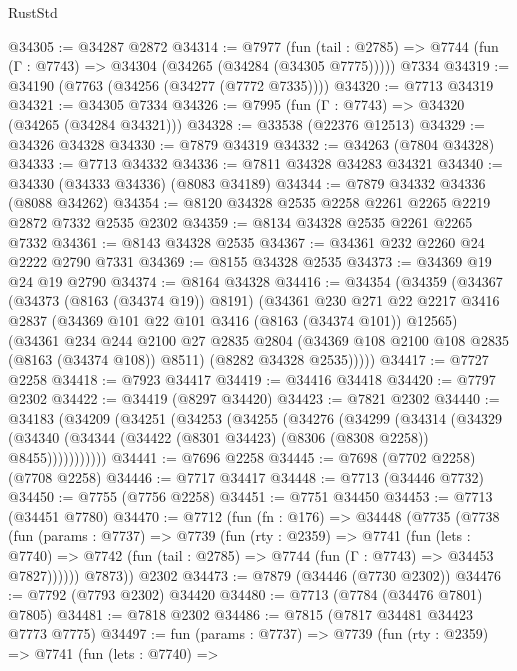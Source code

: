 \begin{lexlean}{RustStd}
\begin{coremodule}
@34305 := @34287 @2872
@34314 := @7977
    (fun (tail : @2785) => @7744 (fun (Γ : @7743) => @34304 (@34265 (@34284 (@34305 @7775)))))
    @7334
@34319 := @34190 (@7763 (@34256 (@34277 (@7772 @7335))))
@34320 := @7713 @34319
@34321 := @34305 @7334
@34326 := @7995 (fun (Γ : @7743) => @34320 (@34265 (@34284 @34321)))
@34328 := @33538 (@22376 @12513)
@34329 := @34326 @34328
@34330 := @7879 @34319
@34332 := @34263 (@7804 @34328)
@34333 := @7713 @34332
@34336 := @7811 @34328 @34283 @34321
@34340 := @34330 (@34333 @34336) (@8083 @34189)
@34344 := @7879 @34332 @34336 (@8088 @34262)
@34354 := @8120 @34328 @2535 @2258 @2261 @2265 @2219 @2872 @7332 @2535 @2302
@34359 := @8134 @34328 @2535 @2261 @2265 @7332
@34361 := @8143 @34328 @2535
@34367 := @34361 @232 @2260 @24 @2222 @2790 @7331
@34369 := @8155 @34328 @2535
@34373 := @34369 @19 @24 @19 @2790
@34374 := @8164 @34328
@34416 := @34354
    (@34359
      (@34367
        (@34373 (@8163 (@34374 @19)) @8191)
        (@34361
          @230
          @271
          @22
          @2217
          @3416
          @2837
          (@34369 @101 @22 @101 @3416 (@8163 (@34374 @101)) @12565)
          (@34361
            @234
            @244
            @2100
            @27
            @2835
            @2804
            (@34369 @108 @2100 @108 @2835 (@8163 (@34374 @108)) @8511)
            (@8282 @34328 @2535)))))
@34417 := @7727 @2258
@34418 := @7923 @34417
@34419 := @34416 @34418
@34420 := @7797 @2302
@34422 := @34419 (@8297 @34420)
@34423 := @7821 @2302
@34440 := @34183
    (@34209
      (@34251
        (@34253
          (@34255
            (@34276
              (@34299
                (@34314
                  (@34329
                    (@34340 (@34344 (@34422 (@8301 @34423) (@8306 (@8308 @2258)) @8455)))))))))))
@34441 := @7696 @2258
@34445 := @7698 (@7702 @2258) (@7708 @2258)
@34446 := @7717 @34417
@34448 := @7713 (@34446 @7732)
@34450 := @7755 (@7756 @2258)
@34451 := @7751 @34450
@34453 := @7713 (@34451 @7780)
@34470 := @7712
    (fun (fn : @176) =>
    @34448
      (@7735
        (@7738
          (fun (params : @7737) =>
          @7739
            (fun (rty : @2359) =>
            @7741
              (fun (lets : @7740) =>
              @7742 (fun (tail : @2785) => @7744 (fun (Γ : @7743) => @34453 @7827))))))
        @7873))
    @2302
@34473 := @7879 (@34446 (@7730 @2302))
@34476 := @7792 (@7793 @2302) @34420
@34480 := @7713 (@7784 (@34476 @7801) @7805)
@34481 := @7818 @2302
@34486 := @7815 (@7817 @34481 @34423 @7773 @7775)
@34497 := fun (params : @7737) =>
  @7739
    (fun (rty : @2359) =>
    @7741
      (fun (lets : @7740) =>

\end{coremodule}
\end{lexlean}
